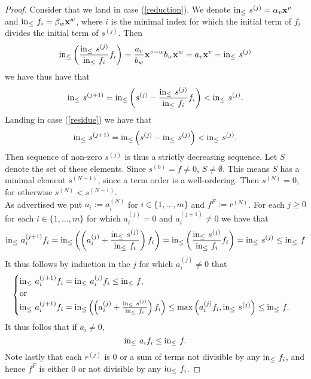 \begin{proof}
    Consider that we land in case (\ref{reduction}). We denote $\mathrm{in}_\leq\ s^{(j)} = \alpha_v\mathbf{x}^v$ and $\mathrm{in}_\leq\ f_i = \beta_w\mathbf{x}^w$, where $i$ is the minimal index for which the initial term of $f_i$ divides the initial term of $s^{(j)}$. Then   
    $$\inn\left(\frac{\inn\ s^{(j)}}{\inn\ f_i}f_i\right) = \frac{a_v}{b_w}\mathbf{x}^{v-w}b_w\mathbf{x}^w = a_v\mathbf{x}^v=\inn\ s^{(j)}$$
    we have thus have that
    $$\mathrm{in}_\leq\ s^{(j+1)} = \mathrm{in}_\leq \left( s^{(j)}- \frac{\mathrm{in}_\leq\ s^{(j)}}{\mathrm{in}_\leq\ f_i}f_i \right)< \mathrm{in}_\leq \ s^{(j)}.$$
    Landing in case (\ref{residue}) we have that 
    $$\inn\ s^{(j+1)}=\inn\left(s^{(j)}- \inn\ s^{(j)}\right) < \inn\ s^{(j)}.$$
    Then sequence of non-zero $s^{(j)}$ is thus a strictly decreasing sequence. Let $S$ denote the set of these elements. Since $s^{(0)} = f\neq 0$, $S\neq \emptyset$. This means $S$ has a minimal element $s^{(N-1)}$, since a term order is a well-ordering. Then $s^{(N)}=0$, for otherwise $s^{(N)}< s^{(N-1)}$.\\
    As advertised we put $a_i := a_i^{(N)}$ for $i\in \{1,\dots,m\}$ and $f^F := r^{(N)}$. For each $j\geq 0$ for each $i\in\{1,\dots,m\}$ for which $a_i^{(j)} = 0 $ and $a_i^{(j+1)} \neq 0$ we have that
    $$\inn\ a_i^{(j+1)}f_i = \inn\left(\left(a_i^{(j)}+\frac{\inn\ s^{(j)}}{\inn \ f_i}\right)f_i\right)= \inn\left(\frac{\inn\ s^{(j)}}{\inn\ f_i} f_i\right) = \inn\ s^{(j)}\leq \inn\ f$$
    It thus follows by induction in the $j$ for which $a_i^{(j)}\neq 0$ that
    \begin{align*}
        \begin{cases} 
            \inn\  a_i^{(j+1)}f_i = \inn\ a_i^{(j)}f_i\leq \inn\ f, \\
            \text{or}\\
            \inn\ a_i^{(j+1)}f_i = \inn\left(\left(a_i^{(j)}+\frac{\inn\ s^{(j)}}{\inn \ f_i}\right)f_i\right)\leq 
            \max\left(a_i^{(j)}f_i,\inn\ s^{(j)}\right)\leq \inn\ f.
        \end{cases}
    \end{align*}
    It thus follos that if $a_i\neq 0$,
    $$\mathrm{in}_\leq\ a_if_i \leq \mathrm{in}_\leq\ f.$$
    Note lastly that each $r^{(j)}$ is $0$ or a sum of terms not divisible by any $\inn\ f_i$, and hence $f^F$ is either $0$ or not divisible by any $\inn\ f_i$.
\end{proof}
